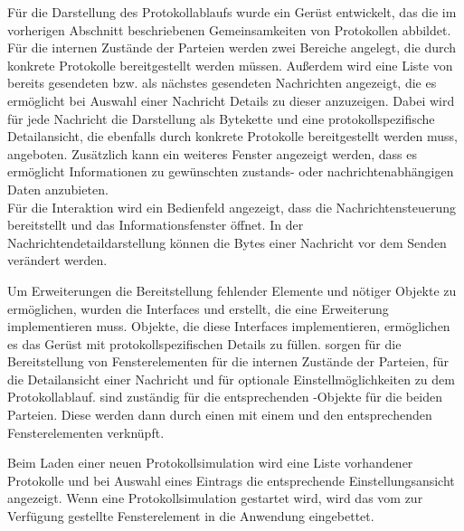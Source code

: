 
Für die Darstellung des Protokollablaufs wurde ein Gerüst entwickelt, das die im vorherigen Abschnitt beschriebenen Gemeinsamkeiten von Protokollen abbildet. Für die internen Zustände der Parteien werden zwei Bereiche angelegt, die durch konkrete Protokolle bereitgestellt werden müssen. Außerdem wird eine Liste von bereits gesendeten bzw. als nächstes gesendeten Nachrichten angezeigt, die es ermöglicht bei Auswahl einer Nachricht Details zu dieser anzuzeigen. Dabei wird für jede Nachricht die Darstellung als Bytekette und eine protokollspezifische Detailansicht, die ebenfalls durch konkrete Protokolle bereitgestellt werden muss, angeboten. Zusätzlich kann ein weiteres Fenster angezeigt werden, dass es ermöglicht Informationen zu gewünschten zustands- oder nachrichtenabhängigen Daten anzubieten.\\
Für die Interaktion wird ein Bedienfeld angezeigt, dass die Nachrichtensteuerung bereitstellt und das Informationsfenster öffnet. In der Nachrichtendetaildarstellung können die Bytes einer Nachricht vor dem Senden verändert werden.


Um Erweiterungen die Bereitstellung fehlender Elemente und nötiger Objekte zu ermöglichen, wurden die Interfaces  und  erstellt, die eine Erweiterung implementieren muss. Objekte, die diese Interfaces implementieren, ermöglichen es das Gerüst mit protokollspezifischen Details zu füllen.  sorgen für die Bereitstellung von Fensterelementen für die internen Zustände der Parteien, für die Detailansicht einer Nachricht und für optionale Einstellmöglichkeiten zu dem Protokollablauf.  sind zuständig für die entsprechenden -Objekte für die beiden Parteien. Diese werden dann durch einen  mit einem  und den entsprechenden Fensterelementen verknüpft.

Beim Laden einer neuen Protokollsimulation wird eine Liste vorhandener Protokolle und bei Auswahl eines Eintrags die entsprechende Einstellungsansicht angezeigt. Wenn eine Protokollsimulation gestartet wird, wird das vom  zur Verfügung gestellte Fensterelement in die Anwendung eingebettet.

